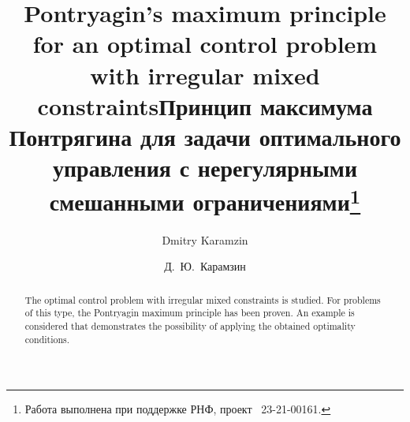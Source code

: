 \begin{englishtitle} %
\title{Pontryagin's maximum principle for an optimal control problem with irregular mixed constraints}
\author{Dmitry Karamzin }

\maketitle

\begin{abstract}
The optimal control problem with irregular mixed constraints is studied. For problems of this type, the Pontryagin maximum principle has been proven. An example is considered that demonstrates the possibility of applying the obtained optimality conditions.

\end{abstract}
\end{englishtitle}

\iffalse
\documentclass[12pt]{llncs}


\usepackage{iftex}

\ifPDFTeX
\usepackage[T2A]{fontenc}
\usepackage[utf8]{inputenc} %
\usepackage[english,russian]{babel}
\fi

\usepackage{todonotes}

\usepackage[russian]{nla}




\fi

\title{Принцип максимума Понтрягина для задачи оптимального управления с нерегулярными смешанными ограничениями\thanks{Работа выполнена при поддержке РНФ, проект \textnumero~23-21-00161.}}
\author{Д.~Ю.~Карамзин
} %


